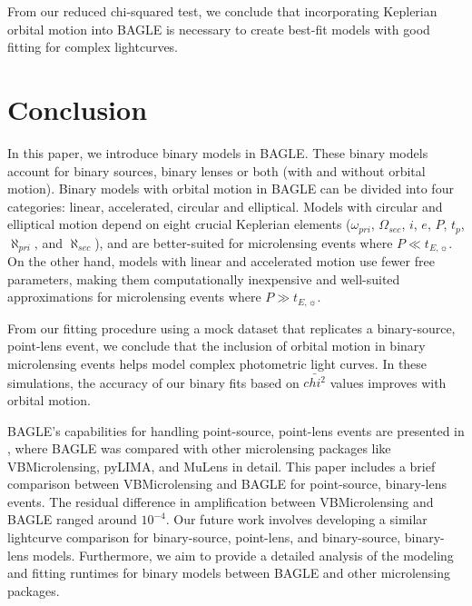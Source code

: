 \documentclass[twocolumn]{aastex701}
\newcommand{\tE}{t_{E,\sun}}
\newcommand{\w}{\omega_{pri}}
\newcommand{\bigomega}{\Omega_{sec}}
\newcommand{\inclination}{\textit{i}}
\newcommand{\eccentricity}{\textit{e}}
\newcommand{\period}{\textit{P}}
\newcommand{\al}{\aleph_{pri}}
\newcommand{\ala}{\aleph_{sec}}
\begin{document}
From our reduced chi-squared test, we conclude that incorporating Keplerian orbital motion into BAGLE is necessary to create best-fit models with good fitting for complex lightcurves. 




\section{Conclusion}
\label{sec:conclusion}

In this paper, we introduce binary models in BAGLE. These binary models account for binary sources, binary lenses or both (with and without orbital motion). Binary models with orbital motion in BAGLE can be divided into four categories: linear, accelerated, circular and elliptical. Models with circular and elliptical motion depend on eight crucial Keplerian elements ($\w$, $\bigomega$, $\inclination$, $\eccentricity$, $\period$, $t_p$, $\al$, and $\ala$), and are better-suited for microlensing events where $\period \ll \tE$. On the other hand, models with linear and accelerated motion use fewer free parameters, making them computationally inexpensive and well-suited approximations for microlensing events where $\period \gg \tE$.

From our fitting procedure using a mock dataset that replicates a binary-source, point-lens event, we conclude that the inclusion of orbital motion in binary microlensing events helps model complex photometric light curves. In these simulations, the accuracy of our binary fits based on $\bar{chi^2}$ values improves with orbital motion. 

BAGLE's capabilities for handling point-source, point-lens events are presented in \citet{Lu:2025}, where BAGLE was compared with other microlensing packages like VBMicrolensing, pyLIMA, and MuLens in detail. This paper includes a brief comparison between VBMicrolensing and BAGLE for point-source, binary-lens events. The residual difference in amplification between VBMicrolensing and BAGLE ranged around $10^{-4}$. Our future work involves developing a similar lightcurve comparison for binary-source, point-lens, and binary-source, binary-lens models. Furthermore, we aim to provide a detailed analysis of the modeling and fitting runtimes for binary models between BAGLE and other microlensing packages. 
\end{document}
